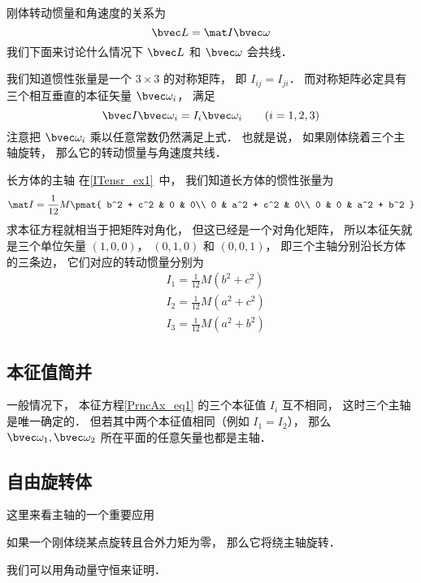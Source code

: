 
\begin{issues}
\issueDraft
\end{issues}


刚体转动惯量和角速度的关系为
\begin{equation}
\bvec L = \mat I \bvec \omega
\end{equation}
我们下面来讨论什么情况下 $\bvec L$ 和 $\bvec \omega$ 会共线．

我们知道惯性张量是一个 $3\times 3$ 的对称矩阵， 即 $I_{ij} = I_{ji}$． 而对称矩阵必定具有三个相互垂直的本征矢量 $\bvec \omega_i$， 满足
\begin{equation}\label{PrncAx_eq1}
\bvec I \bvec \omega_i = I_i \bvec \omega_i \qquad (i = 1,2,3)
\end{equation}
注意把 $\bvec \omega_i$ 乘以任意常数仍然满足上式． 也就是说， 如果刚体绕着三个主轴旋转， 那么它的转动惯量与角速度共线．

\begin{example}{长方体的主轴}
在\autoref{ITensr_ex1}~中， 我们知道长方体的惯性张量为
\begin{equation}
\mat I = \frac{1}{12} M
\pmat{
   b^2 + c^2 & 0 & 0\\
   0 & a^2 + c^2 & 0\\
   0 & 0 & a^2 + b^2
}
\end{equation}
求本征方程就相当于把矩阵对角化， 但这已经是一个对角化矩阵， 所以本征矢就是三个单位矢量 $(1,0,0)$， $(0,1,0)$ 和 $(0,0,1)$， 即三个主轴分别沿长方体的三条边， 它们对应的转动惯量分别为
\begin{equation}
\begin{aligned}
&I_1 = \frac{1}{12}M(b^2+c^2)\\
&I_2 = \frac{1}{12}M(a^2+c^2)\\
&I_3 = \frac{1}{12}M(a^2+b^2)
\end{aligned}
\end{equation}
\end{example}

\subsection{本征值简并}
一般情况下， 本征方程\autoref{PrncAx_eq1} 的三个本征值 $I_i$ 互不相同， 这时三个主轴是唯一确定的． 但若其中两个本征值相同（例如 $I_1 = I_2$）， 那么 $\bvec \omega_1, \bvec \omega_2$ 所在平面的任意矢量也都是主轴．

\subsection{自由旋转体}
这里来看主轴的一个重要应用
\begin{theorem}{}
如果一个刚体绕某点旋转且合外力矩为零， 那么它将绕主轴旋转．
\end{theorem}
我们可以用角动量守恒来证明．
